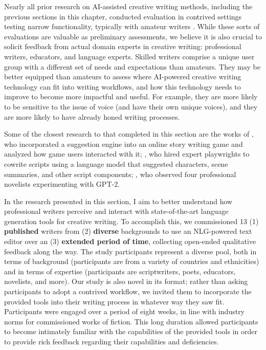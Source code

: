 Nearly all prior research on AI-assisted creative writing methods, including the previous sections in this chapter, conducted evaluation in contrived settings testing narrow functionality, typically with amateur writers \citep{clark2018creative,yuan2022wordcraft,roemmele2015creative,roemmele2021inspiration,nichols2020collaborative}.
While these sorts of evaluations are valuable as preliminary assessments, we believe it is also crucial to solicit feedback from actual domain experts in creative writing: professional writers, educators, and language experts.
Skilled writers comprise a unique user group with a different set of needs and expectations than amateurs.
They may be better equipped than amateurs to assess where AI-powered creative writing technology can fit into writing workflows, and how this technology needs to improve to become more impactful and useful.
For example, they are more likely to be sensitive to the issue of voice (and have their own unique voices), and they are more likely to have already honed writing processes.

Some of the closest research to that completed in this section are the works of \citet{akoury2020storium}, who incorporated a suggestion engine into an online story writing game and analyzed how game users interacted with it; \citet{mirowski2022co}, who hired expert playwrights to cowrite scripts using a language model that suggested characters, scene summaries, and other script components; \citet{calderwood2020novelists}, who observed four professional novelists experimenting with GPT-2.


In the research presented in this section, I aim to better understand how professional writers perceive and interact with state-of-the-art language generation tools for creative writing.
To accomplish this, we commissioned 13 (1) \textbf{published} writers from (2) \textbf{diverse} backgrounds to use an NLG-powered text editor over an (3) \textbf{extended period of time}, collecting open-ended qualitative feedback along the way.
The study participants represent a diverse pool, both in terms of background (participants are from a variety of countries and ethnicities) and in terms of expertise (participants are scriptwriters, poets, educators, novelists, and more).
Our study is also novel in its format; rather than asking participants to adopt a contrived workflow, we invited them to incorporate the provided tools into their writing process in whatever way they saw fit.
Participants were engaged over a period of eight weeks, in line with industry norms for commissioned works of fiction.
This long duration allowed participants to become intimately familiar with the capabilities of the provided tools in order to provide rich feedback regarding their capabilities and deficiencies.

